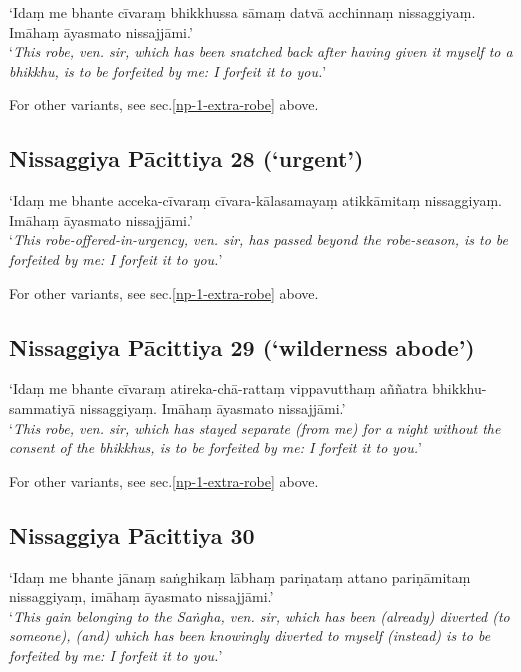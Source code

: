 ‘Idaṃ me bhante cīvaraṃ bhikkhussa sāmaṃ datvā acchinnaṃ nissaggiyaṃ. Imāhaṃ
āyasmato nissajjāmi.’\\
‘\emph{This robe, ven. sir, which has been snatched back after having given it
  myself to a bhikkhu, is to be forfeited by me: I forfeit it to you.}’


For other variants, see sec.\ref{np-1-extra-robe} above.

\subsection{Nissaggiya Pācittiya 28 (‘urgent’)}

‘Idaṃ me bhante acceka-cīvaraṃ cīvara-kālasamayaṃ atikkāmitaṃ nissaggiyaṃ.
Imāhaṃ āyasmato nissajjāmi.’\\
‘\emph{This robe-offered-in-urgency, ven. sir, has passed beyond the
  robe-season, is to be forfeited by me: I forfeit it to you.}’


For other variants, see sec.\ref{np-1-extra-robe} above.

\subsection{Nissaggiya Pācittiya 29 (‘wilderness abode’)}

‘Idaṃ me bhante cīvaraṃ atireka-chā-rattaṃ vippavutthaṃ aññatra
bhikkhu-sammatiyā nissaggiyaṃ. Imāhaṃ āyasmato nissajjāmi.’\\
‘\emph{This robe, ven. sir, which has stayed separate (from me) for a night
  without the consent of the bhikkhus, is to be forfeited by me: I forfeit it to
  you.}’


For other variants, see sec.\ref{np-1-extra-robe} above.

\subsection{Nissaggiya Pācittiya 30}

‘Idaṃ me bhante jānaṃ saṅghikaṃ lābhaṃ pariṇataṃ attano pariṇāmitaṃ nissaggiyaṃ,
imāhaṃ āyasmato nissajjāmi.’\\
‘\emph{This gain belonging to the Saṅgha, ven. sir, which has been (already)
  diverted (to someone), (and) which has been knowingly diverted to myself
  (instead) is to be forfeited by me: I forfeit it to you.}’

